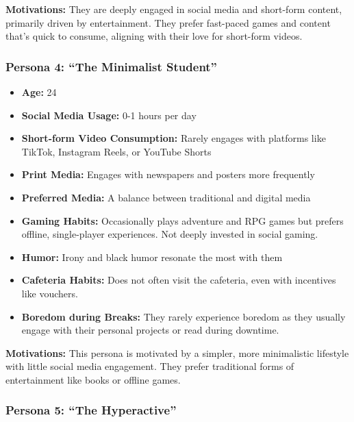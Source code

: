 \documentclass{article}
\begin{document}
\textbf{Motivations:} They are deeply engaged in social media and
short-form content, primarily driven by entertainment. They prefer
fast-paced games and content that's quick to consume, aligning with
their love for short-form videos.

\subsubsection{Persona 4: ``The Minimalist Student''}\label{persona-4-the-minimalist-student}

\begin{itemize}
\item
  \textbf{Age:} 24
\item
  \textbf{Social Media Usage:} 0-1 hours per day
\item
  \textbf{Short-form Video Consumption:} Rarely engages with platforms
  like TikTok, Instagram Reels, or YouTube Shorts
\item
  \textbf{Print Media:} Engages with newspapers and posters more
  frequently
\item
  \textbf{Preferred Media:} A balance between traditional and digital
  media
\item
  \textbf{Gaming Habits:} Occasionally plays adventure and RPG games but
  prefers offline, single-player experiences. Not deeply invested in
  social gaming.
\item
  \textbf{Humor:} Irony and black humor resonate the most with them
\item
  \textbf{Cafeteria Habits:} Does not often visit the cafeteria, even
  with incentives like vouchers.
\item
  \textbf{Boredom during Breaks:} They rarely experience boredom as they
  usually engage with their personal projects or read during downtime.
\end{itemize}

\textbf{Motivations:} This persona is motivated by a simpler, more
minimalistic lifestyle with little social media engagement. They prefer
traditional forms of entertainment like books or offline games.

\subsubsection{Persona 5: ``The Hyperactive''}\label{persona-5-the-hyperactive}
\end{document}
